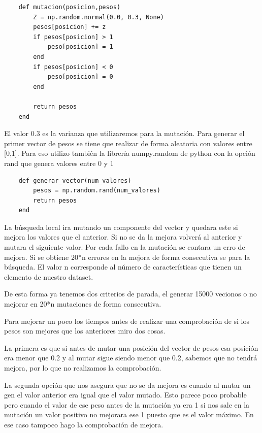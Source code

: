 \documentclass[titlepage]{article}
\begin{document}
	\begin{lstlisting}
	def mutacion(posicion,pesos)
		Z = np.random.normal(0.0, 0.3, None)
		pesos[posicion] += z
		if pesos[posicion] > 1 
			peso[posicion] = 1
		end 
		if pesos[posicion] < 0
			peso[posicion] = 0
		end 
			
		return pesos
	end
	\end{lstlisting}
	
	El valor 0.3 es la varianza que utilizaremos para la mutación.
	Para generar el primer vector de pesos se tiene que realizar de forma aleatoria con valores entre [0,1]. Para eso utilizo también la librería numpy.random de python con la opción rand que genera valores entre 0 y 1
	
	\begin{lstlisting}
	def generar_vector(num_valores)
		pesos = np.random.rand(num_valores)
		return pesos
	end
	\end{lstlisting}
	
	La búsqueda local ira mutando un componente del vector y quedara este si mejora los valores que el anterior. Si no se da la mejora volverá al anterior y mutara el siguiente valor. Por cada fallo en la mutación se contara un erro de mejora. Si se obtiene 20*n errores en la mejora de forma consecutiva se para la búsqueda. El valor n corresponde al número de características que tienen un elemento de nuestro dataset.
	
	De esta forma ya tenemos dos criterios de parada, el generar 15000 vecionos o no mejorar en 20*n mutaciones de forma consecutiva.
	
	Para mejorar un poco los tiempos antes de realizar una comprobación de si los pesos son mejores que los anteriores miro dos cosas.
	
	La primera es que si antes de mutar una posición del vector de pesos esa posición era menor que 0.2 y al mutar sigue siendo menor que 0.2, sabemos que no tendrá mejora, por lo que no realizamos la comprobación.
	
	La segunda opción que nos asegura que no se da mejora es cuando al mutar un gen el valor anterior era igual que el valor mutado. Esto parece poco probable pero cuando el valor de ese peso antes de la mutación ya era 1 si nos sale en la mutación un valor positivo no mejorara ese 1 puesto que es el valor máximo. En ese caso tampoco hago la comprobación de mejora.
	
\end{document}

